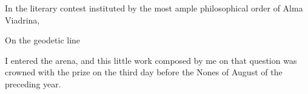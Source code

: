 In the literary contest instituted by the most ample philosophical order of Alma Viadrina,
\begin{center}
\textbullet On the geodetic line\textbullet
\end{center}
I entered the arena, and this little work composed by me on that question was crowned with the prize on the third day before the Nones of August of the preceding year.

\GordanOrnament
\endgroup
